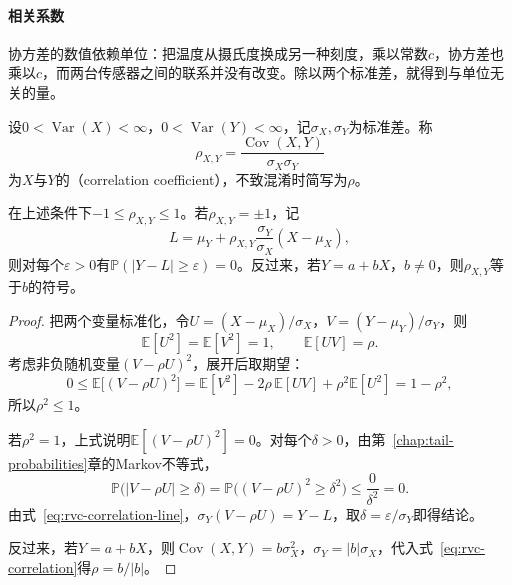 \paragraph{相关系数}
协方差的数值依赖单位：把温度从摄氏度换成另一种刻度，乘以常数$c$，协方差也乘以$c$，而两台传感器之间的联系并没有改变。除以两个标准差，就得到与单位无关的量。

\begin{definition}[相关系数]
\label{def:rvc-correlation}
设$0<\operatorname{Var}(X)<\infty$，$0<\operatorname{Var}(Y)<\infty$，记$\sigma_X,\sigma_Y$为标准差。称
\begin{equation}
 \rho_{X,Y}=\frac{\operatorname{Cov}(X,Y)}{\sigma_X\sigma_Y}
 \label{eq:rvc-correlation}
\end{equation}
为$X$与$Y$的（correlation coefficient），不致混淆时简写为$\rho$。
\end{definition}

\begin{theorem}[相关系数的范围]
\label{thm:rvc-correlation-bound}
在上述条件下$-1\leq\rho_{X,Y}\leq 1$。若$\rho_{X,Y}=\pm1$，记
\begin{equation}
 L=\mu_Y+\rho_{X,Y}\frac{\sigma_Y}{\sigma_X}(X-\mu_X),
 \label{eq:rvc-correlation-line}
\end{equation}
则对每个$\varepsilon>0$有$\mathbb{P}(\lvert Y-L\rvert\geq\varepsilon)=0$。反过来，若$Y=a+bX$，$b\neq0$，则$\rho_{X,Y}$等于$b$的符号。
\end{theorem}

\begin{proof}
把两个变量标准化，令$U=(X-\mu_X)/\sigma_X$，$V=(Y-\mu_Y)/\sigma_Y$，则
\[
 \mathbb{E}[U^{2}]=\mathbb{E}[V^{2}]=1,\qquad \mathbb{E}[UV]=\rho .
\]
考虑非负随机变量$(V-\rho U)^{2}$，展开后取期望：
\[
 0\leq\mathbb{E}\bigl[(V-\rho U)^{2}\bigr]=\mathbb{E}[V^{2}]-2\rho\,\mathbb{E}[UV]+\rho^{2}\mathbb{E}[U^{2}]=1-\rho^{2},
\]
所以$\rho^{2}\leq1$。

若$\rho^{2}=1$，上式说明$\mathbb{E}[(V-\rho U)^{2}]=0$。对每个$\delta>0$，由第~\ref{chap:tail-probabilities}章的Markov不等式，
\[
 \mathbb{P}\bigl(\lvert V-\rho U\rvert\geq\delta\bigr)=\mathbb{P}\bigl((V-\rho U)^{2}\geq\delta^{2}\bigr)\leq\frac{0}{\delta^{2}}=0 .
\]
由式~\eqref{eq:rvc-correlation-line}，$\sigma_Y(V-\rho U)=Y-L$，取$\delta=\varepsilon/\sigma_Y$即得结论。

反过来，若$Y=a+bX$，则$\operatorname{Cov}(X,Y)=b\sigma_X^{2}$，$\sigma_Y=\lvert b\rvert\sigma_X$，代入式~\eqref{eq:rvc-correlation}得$\rho=b/\lvert b\rvert$。
\end{proof}

